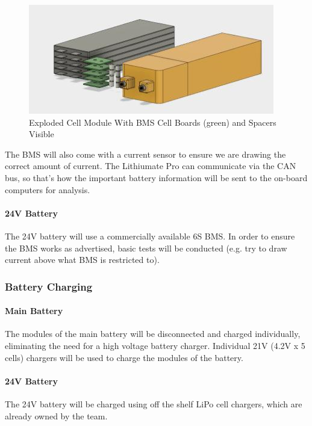 \documentclass[main.tex]{subfiles}
\begin{document}
     \begin{figure}[H]
        \centering
        \includegraphics[width=\linewidth]{images/ExplodedModule}
        \caption{Exploded Cell Module With BMS Cell Boards (green) and Spacers Visible}
        \label{fig:exploded-cell}
    \end{figure}
     
	The BMS will also come with a current sensor to ensure we are drawing the correct amount of current.
	The Lithiumate Pro can communicate via the CAN bus, so that's how the important battery information will be sent to the on-board computers for analysis.     
     
    \paragraph{24V Battery}
	The 24V battery will use a commercially available 6S BMS. In order to ensure the BMS works as advertised, basic tests will be conducted (e.g. try to draw current above what BMS is restricted to).
    
	\subsubsection{Battery Charging}
    \paragraph{Main Battery} 
	The modules of the main battery will be disconnected and charged individually, eliminating the need for a high voltage battery charger. Individual 21V (4.2V x 5 cells) chargers will be used to charge the modules of the battery.
    \paragraph{24V Battery}
    The 24V battery will be charged using off the shelf LiPo cell chargers, which are already owned by the team.
    
\end{document}
